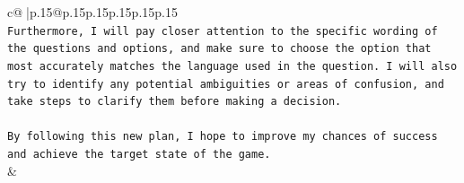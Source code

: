 \documentclass{article}
\begin{document}
{\begin{supertabular}{c@{$\;$}|p{.15\linewidth}@{}p{.15\linewidth}p{.15\linewidth}p{.15\linewidth}p{.15\linewidth}p{.15\linewidth}}
{{{\\ 
\texttt{Furthermore, I will pay closer attention to the specific wording of the questions and options, and make sure to choose the option that most accurately matches the language used in the question. I will also try to identify any potential ambiguities or areas of confusion, and take steps to clarify them before making a decision.} \\
\\ 
\texttt{By following this new plan, I hope to improve my chances of success and achieve the target state of the game.} \\
            }
        }
    }
    & \\ \\

\end{supertabular}
}
\end{document}
